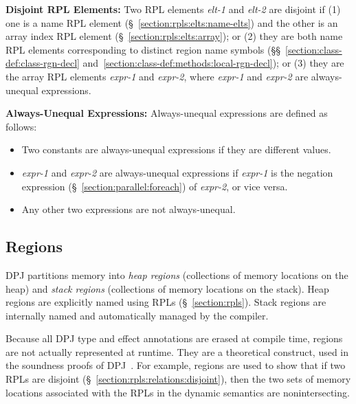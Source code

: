 \noindent
\textbf{Disjoint RPL Elements:} Two RPL elements \emph{elt-1} and
\emph{elt-2} are disjoint if (1) one is a name RPL element
(\S~\ref{section:rpls:elts:name-elts}) and the other is an array index
RPL element (\S~\ref{section:rpls:elts:array}); or (2) they are both
name RPL elements corresponding to distinct region name symbols
(\S\S~\ref{section:class-def:class-rgn-decl}
and~\ref{section:class-def:methods:local-rgn-decl}); or (3) they are
the array RPL elements \kwd{[}\emph{expr-1}\kwd{]} and
\kwd{[}\emph{expr-2}\kwd{]}, where \emph{expr-1} and \emph{expr-2} are
always-unequal expressions.


\noindent
\textbf{Always-Unequal Expressions:} Always-unequal expressions are
defined as follows:
%
\begin{itemize}
%
\item Two constants are always-unequal expressions if they are
  different values.
%
\item \emph{expr-1} and \emph{expr-2} are always-unequal expressions
  if \emph{expr-1} is the negation expression
  (\S~\ref{section:parallel:foreach}) of \emph{expr-2}, or vice versa.
%
%
%
\item Any other two expressions are not always-unequal.
%
\end{itemize}

\subsection{Regions}
\label{section:rpls:regions}

DPJ partitions memory into \emph{heap regions} (collections of memory
locations on the heap) and \emph{stack regions} (collections of memory
locations on the stack).  Heap regions are explicitly named using RPLs
(\S~\ref{section:rpls}).  Stack regions are internally named and
automatically managed by the compiler.

Because all DPJ type and effect annotations are erased at compile
time, regions are not actually represented at runtime.  They are a
theoretical construct, used in the soundness proofs of
DPJ~\cite{DPJ:FormalTR08}.  For example, regions are used to show that
if two RPLs are disjoint (\S~\ref{section:rpls:relations:disjoint}),
then the two sets of memory locations associated with the RPLs in the
dynamic semantics are nonintersecting.

